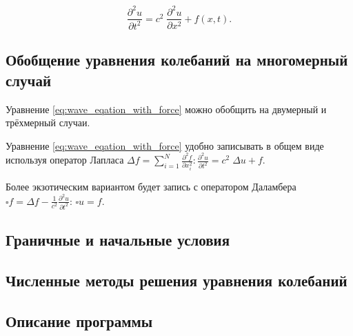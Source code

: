 \documentclass[12pt,a4paper,russian]{report}
\begin{document}
	\begin{equation} \label{eq:wave_eqation_with_force}
		\frac{\partial^2 u}{\partial t^2} = c^2 \; \frac{\partial^2 u}{\partial x^2} + f(x, t).
	\end{equation}
	
	\subsection{Обобщение уравнения колебаний на многомерный случай}
	
	
	Уравнение \eqref{eq:wave_eqation_with_force} можно обобщить на двумерный и трёхмерный случаи.  
	
	
	Уравнение \eqref{eq:wave_eqation_with_force} удобно записывать в общем виде используя оператор Лапласа $ \displaystyle \Delta f = \sum_{i=1}^{N} \frac{\partial^2 f}{\partial x_i^2}: \frac{\partial^2 u}{\partial t^2} = c^2 \; \Delta u + f $.
		
	Более экзотическим вариантом будет запись с оператором Даламбера $ \displaystyle \square f = \Delta f - \frac{1}{c^2} \frac{\partial^2 u}{\partial t^2}$: $ \square u = f $.
	
	
	\subsection{Граничные и начальные условия}
	
	
	\subsection{Численные методы решения уравнения колебаний}
	
	
	
	\subsection{Описание программы}
	
	
\end{document}
